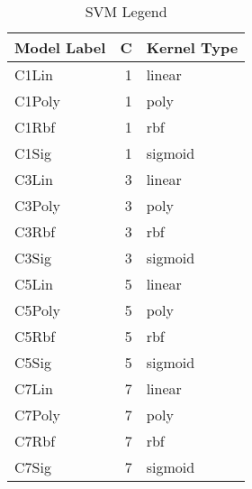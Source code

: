 \begin{table}
\centering
\caption{SVM Legend}
\label{tab:SVM_legend}
\begin{tabular}{lrl}
\toprule
Model Label & C & Kernel Type \\
\midrule
C1Lin & 1 & linear \\
C1Poly & 1 & poly \\
C1Rbf & 1 & rbf \\
C1Sig & 1 & sigmoid \\
C3Lin & 3 & linear \\
C3Poly & 3 & poly \\
C3Rbf & 3 & rbf \\
C3Sig & 3 & sigmoid \\
C5Lin & 5 & linear \\
C5Poly & 5 & poly \\
C5Rbf & 5 & rbf \\
C5Sig & 5 & sigmoid \\
C7Lin & 7 & linear \\
C7Poly & 7 & poly \\
C7Rbf & 7 & rbf \\
C7Sig & 7 & sigmoid \\
\bottomrule
\end{tabular}
\end{table}
